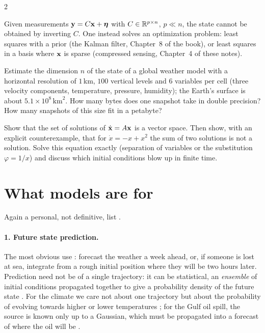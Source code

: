 \begin{paracol}{2}
\begin{example}
Given measurements $\mathbf{y}=C\mathbf{x}+\boldsymbol\eta$ with $C\in\mathbb{R}^{p\times n}$, $p\ll n$, the state cannot be
obtained by inverting $C$. One instead solves an optimization problem: least squares with a prior
(the Kalman filter, Chapter~8 of the book), or least squares in a basis where $\mathbf{x}$ is sparse
(compressed sensing, Chapter~4 of these notes).
\end{example}

\begin{exercise}
Estimate the dimension $n$ of the state of a global weather model with a horizontal resolution of
$1\,$km, $100$ vertical levels and $6$ variables per cell (three velocity components, temperature,
pressure, humidity); the Earth's surface is about $5.1\times10^8\,\mathrm{km}^2$. How many bytes does
one snapshot take in double precision? How many snapshots of this size fit in a petabyte?
\end{exercise}

\begin{exercise}[Superposition]
Show that the set of solutions of $\dot{\mathbf{x}}=A\mathbf{x}$ is a vector space. Then show, with an explicit
counterexample, that for $\dot x=-x+x^2$ the sum of two solutions is not a solution. Solve this
equation exactly (separation of variables or the substitution $\varphi=1/x$) and discuss which initial
conditions blow up in finite time.
\end{exercise}

\section{What models are for}\label{sec:ov-uses}

Again a personal, not definitive, list .

\paragraph{1. Future state prediction.} The most obvious use :
forecast the weather a week ahead, or, if someone is lost at sea, integrate from a rough initial
position where they will be two hours later. Prediction need not be of a single trajectory: it can be
statistical, an \emph{ensemble} of initial conditions propagated together to give a probability
density of the future state . For the climate we care not about one
trajectory but about the probability of evolving towards higher or lower temperatures
; for the Gulf oil spill, the source is known only up to a Gaussian, which must be
propagated into a forecast of where the oil will be .


\end{paracol}
